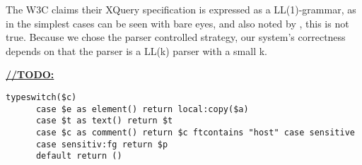The W3C claims their XQuery specification is expressed as a LL(1)-grammar\cite{createTokenizer}, as in the simplest cases can be seen with bare eyes, and also noted by \cite{kang_xquery_diglib}, this is not true. Because we chose the parser controlled strategy, our system's correctness depends on that the parser is a LL(k) parser with a small k.

\underline{\textbf{\LARGE //TODO:}}
\begin{verbatim}
typeswitch($c) 
      case $e as element() return local:copy($a)
      case $t as text() return $t
      case $c as comment() return $c ftcontains "host" case sensitive
      case sensitiv:fg return $p
      default return ()
\end{verbatim}




